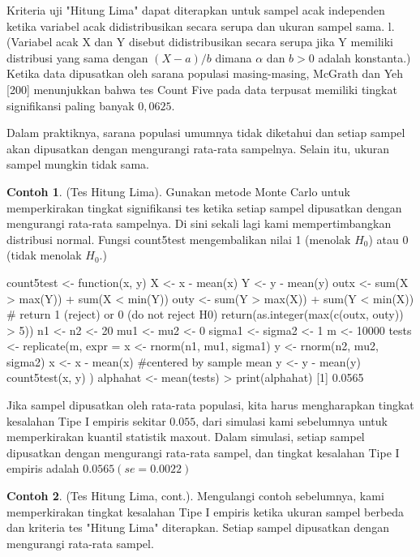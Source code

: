 \documentclass[a4paper,12pt]{article}
\theoremstyle{definition}
\newtheorem{example}{Contoh}[section]
\begin{document}
Kriteria uji "Hitung Lima" dapat diterapkan untuk sampel acak independen ketika variabel acak didistribusikan secara serupa dan ukuran sampel sama. l. (Variabel acak X dan Y disebut didistribusikan secara serupa jika Y memiliki distribusi yang sama dengan $( X - a)/b$ dimana $\alpha$ dan $b > 0$ adalah konstanta.) Ketika data dipusatkan oleh sarana populasi masing-masing, McGrath dan Yeh [200] menunjukkan bahwa tes Count Five pada data terpusat memiliki tingkat signifikansi paling banyak $0,0625.$

Dalam praktiknya, sarana populasi umumnya tidak diketahui dan setiap sampel akan dipusatkan dengan mengurangi rata-rata sampelnya. Selain itu, ukuran sampel mungkin tidak sama.
\begin{example}
    (Tes Hitung Lima). Gunakan metode Monte Carlo untuk memperkirakan tingkat signifikansi tes ketika setiap sampel dipusatkan dengan mengurangi rata-rata sampelnya. Di sini sekali lagi kami mempertimbangkan distribusi normal. Fungsi count5test mengembalikan nilai 1 (menolak $H_{0}$) atau $0$(tidak menolak $H_{0}.$)
\end{example}
\begin{spverbatim}
    count5test <- function(x, y) {
         X <- x - mean(x)
         Y <- y - mean(y) 
         outx <- sum(X > max(Y)) + sum(X < min(Y))
         outy <- sum(Y > max(X)) + sum(Y < min(X))
         # return 1 (reject) or 0 (do not reject H0)
         return(as.integer(max(c(outx, outy)) > 5))
    }
    n1 <- n2 <- 20
    mu1 <- mu2 <- 0
    sigma1 <- sigma2 <- 1
    m <- 10000
    tests <- replicate(m, expr = {
        x <- rnorm(n1, mu1, sigma1)
        y <- rnorm(n2, mu2, sigma2)
        x <- x - mean(x) #centered by sample mean
        y <- y - mean(y)
        count5test(x, y)
    } )
    alphahat <- mean(tests)
    > print(alphahat)
    [1] 0.0565
\end{spverbatim}
Jika sampel dipusatkan oleh rata-rata populasi, kita harus mengharapkan tingkat kesalahan Tipe I empiris sekitar $0.055$, dari simulasi kami sebelumnya untuk memperkirakan kuantil statistik maxout. Dalam simulasi, setiap sampel dipusatkan dengan mengurangi rata-rata sampel, dan tingkat kesalahan Tipe I empiris adalah $0.0565 (se=0.0022)$
\begin{example}
(Tes Hitung Lima, cont.). Mengulangi contoh sebelumnya, kami memperkirakan tingkat kesalahan Tipe I empiris ketika ukuran sampel berbeda dan kriteria tes "Hitung Lima" diterapkan. Setiap sampel dipusatkan dengan mengurangi rata-rata sampel.
\end{example}
\end{document}
